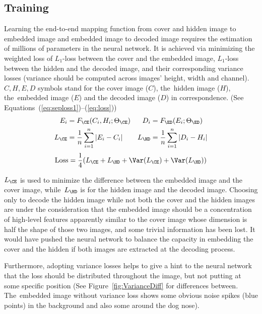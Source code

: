 \documentclass[futureinternet,article,accept,moreauthors,pdftex,10pt,a4paper]{Definitions/mdpi}
\newcommand{\abs}[1]{ \left\lvert#1\right\rvert}
\begin{document}
\subsection{Training}%
\label{ssec:training}

Learning the end-to-end mapping function from cover and hidden image to embedded image and embedded image to decoded image requires the estimation of millions of parameters in the neural network. It is achieved via minimizing the weighted loss of \(L_{1}\)-loss between the cover and the embedded image, \(L_{1}\)-loss between the hidden and the decoded image, and their corresponding variance losses (variance should be computed across images' height, width and channel). \(C, H, E, D\) symbols stand for the cover image (\(C\)), the~hidden image (\(H\)), the~embedded image (\(E\)) and the decoded image (\(D\)) in correspondence. (See Equations~(\ref{eq:seploss1})--(\ref{eq:loss}))
\begin{align}
E_{i} &= F_{\CE}(C_{i}, H_{i}; \Theta_{\CE}) & D_{i} &= F_{\ED}(E_{i}; \Theta_{\ED})
\label{eq:seploss1}\\
L_{\CE} &= \frac{1}{n} \sum_{i=1}^{n} \abs{E_{i} - C_{i}} & L_{\HD} &= \frac{1}{n} \sum_{i=1}^{n} \abs{D_{i} - H_{i}}
\label{eq:seploss2}
\end{align}
\begin{equation} \label{eq:loss}
\mathrm{Loss} = \frac{1}{4} (L_{\CE} + L_{\HD} + \Var(L_{\CE}) + \Var(L_{\HD}))
\end{equation}

\(L_{\CE}\) is used to minimize the difference between the embedded image and the cover image, while~\(L_{\HD}\) is for the hidden image and the decoded image. Choosing only to decode the hidden image while not both the cover and the hidden images are under the consideration that the embedded image should be a concentration of high-level features apparently similar to the cover image whose dimension is half the shape of those two images, and some trivial information has been lost. It would have pushed the neural network to balance the capacity in embedding the cover and the hidden if both images are extracted at the decoding process.

Furthermore, adopting variance losses helps to give a hint to the neural network that the loss should be distributed throughout the image, but not putting at some specific position (See Figure~\ref{fig:VarianceDiff} for differences between. The~embedded image without variance loss shows some obvious noise spikes (blue points) in the background and also some around the dog nose).
\end{document}
